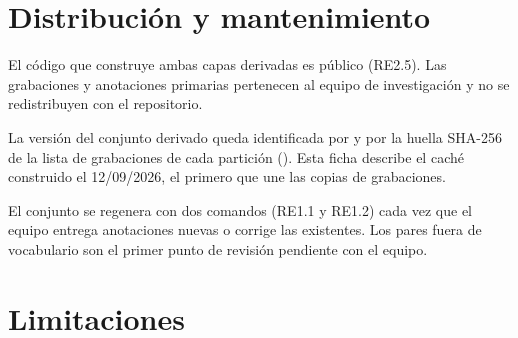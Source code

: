 \documentclass[12pt,a4paper]{article}
\begin{document}
\section{Distribución y mantenimiento}

 El código que construye ambas capas derivadas es público (RE2.5). Las
grabaciones y anotaciones primarias pertenecen al equipo de investigación y no se redistribuyen
con el repositorio. 

 La versión del conjunto derivado queda identificada por  y
por la huella SHA-256 de la lista de grabaciones de cada partición
(). Esta ficha describe el caché construido el
12/09/2026, el primero que une las copias de grabaciones.

 El conjunto se regenera con dos comandos (RE1.1 y RE1.2) cada vez que
el equipo entrega anotaciones nuevas o corrige las existentes. Los pares fuera de vocabulario
son el primer punto de revisión pendiente con el equipo.

\section{Limitaciones}
\label{sec:limitaciones}
\end{document}
